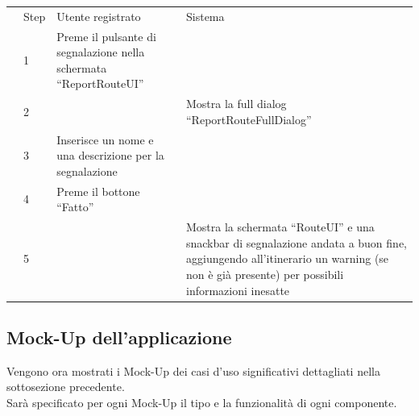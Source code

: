 \documentclass{natourDoc}
\begin{document}
\begin{tabularx}{\linewidth}{|l| p{1cm} | p{4cm} | X |}
	\hline
	\multirow{2}{*}{}
	                              & Step                                                 & Utente registrato                                                 & Sistema                                                                          \\

	\cline{2-4}                   & 1                                                    & Preme il pulsante di segnalazione nella schermata “ReportRouteUI” &                                                                                  \\

	\cline{2-4}                   & 2                                                    &                                                                   & Mostra la full dialog “ReportRouteFullDialog”                                    \\

	\cline{2-4}                   & 3                                                    & Inserisce un nome e una descrizione per la segnalazione           &                                                                                  \\

	\cline{2-4}                   & 4                                                    & Preme il bottone “Fatto”                                          &                                                                                  \\

	\cline{2-4}                   & 5                                                    &                                                                   & Mostra la schermata “RouteUI” e una snackbar di segnalazione andata a buon fine,
	aggiungendo all’itinerario un warning (se non è già presente) per possibili informazioni inesatte                                                                                                                                           \\

	\hline
\end{tabularx}

\newpage
\subsection{Mock-Up dell'applicazione}
Vengono ora mostrati i Mock-Up dei casi d'uso significativi dettagliati nella sottosezione precedente.\\
Sarà specificato per ogni Mock-Up il tipo e la funzionalità di ogni componente.
\end{document}
